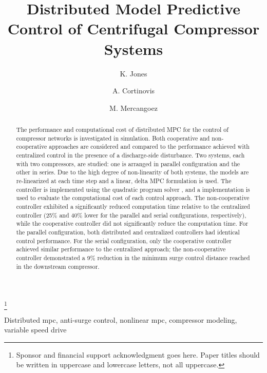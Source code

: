 \documentclass{ifacconf}
\begin{document}
\begin{frontmatter}

\title{Distributed Model Predictive Control of Centrifugal Compressor Systems} 

\thanks[footnoteinfo]{Sponsor and financial support acknowledgment
goes here. Paper titles should be written in uppercase and lowercase
letters, not all uppercase.}

\author[First]{K. Jones} 
\author[First]{A. Cortinovis} 
\author[First]{M. Mercangoez}

\address[First]{ABB Switzerland Ltd., Corporate Research, Baden-Dättwil, Switzerland (e-mail: katie.jones@reactive-robotics.com, andrea.cortinovis@ch.abb.com, mehmet.mercangoez@ch.abb.com).}

\begin{abstract}                %
The performance and computational cost of distributed MPC for the control of compressor networks is investigated in simulation.
Both cooperative and non-cooperative approaches are considered and compared to the performance achieved with centralized control in the presence of a discharge-side disturbance.
Two systems, each with two compressors, are studied: one is arranged in parallel configuration and the other in series.
Due to the high degree of non-linearity of both systems, the models are re-linearized at each time step and a linear, delta MPC formulation is used.
The controller is implemented using the quadratic program solver \qpoases{}, and a \cpp{} implementation is used to evaluate the computational cost of each control approach.
The non-cooperative controller exhibited a significantly reduced computation time relative to the centralized controller (25\% and 40\% lower for the parallel and serial configurations, respectively), while the cooperative controller did not significantly reduce the computation time.
For the parallel configuration, both distributed and centralized controllers had identical control performance.
For the serial configuration, only the cooperative controller achieved similar performance to the centralized approach; the non-cooperative controller demonstrated a 9\% reduction in the minimum surge control distance reached in the downstream compressor.
\end{abstract}

\begin{keyword}
  Distributed mpc, anti-surge control, nonlinear mpc, compressor modeling, variable speed drive
\end{keyword}

\end{frontmatter}
\end{document}
